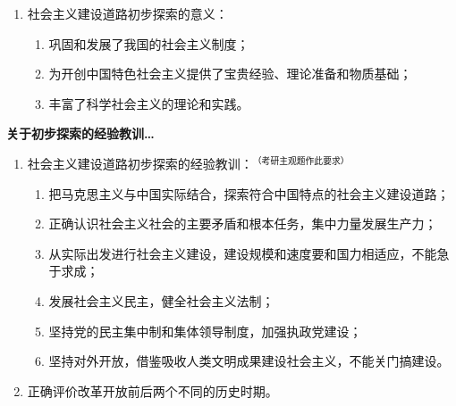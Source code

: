 \documentclass[UTF8]{ctexart}
\begin{document}
\begin{enumerate}[start=19]
  \item 社会主义建设道路初步探索的意义：
  \begin{enumerate}[label={\roman{enumii})}, start=1]
    \item 巩固和发展了我国的社会主义制度；
    \item 为开创中国特色社会主义提供了宝贵经验、理论准备和物质基础；
    \item 丰富了科学社会主义的理论和实践。
  \end{enumerate}
\end{enumerate}

\begin{mybox}{4}
\textbf{关于初步探索的经验教训…}
\begin{enumerate}[start=20]
  \item 社会主义建设道路初步探索的经验教训：$^{\text{（考研主观题作此要求）}}$
  \begin{enumerate}[label={\roman{enumii})}, start=1]
    \item 把马克思主义与中国实际结合，探索符合中国特点的社会主义建设道路；
    \item 正确认识社会主义社会的主要矛盾和根本任务，集中力量发展生产力；
    \item 从实际出发进行社会主义建设，建设规模和速度要和国力相适应，不能急于求成；
    \item 发展社会主义民主，健全社会主义法制；
    \item 坚持党的民主集中制和集体领导制度，加强执政党建设；
    \item 坚持对外开放，借鉴吸收人类文明成果建设社会主义，不能关门搞建设。
  \end{enumerate}
  \item 正确评价改革开放前后两个不同的历史时期。
\end{enumerate}
\end{mybox}


\newpage
{}
\BgThispage
\pagecolor{c5-med}
\end{document}
